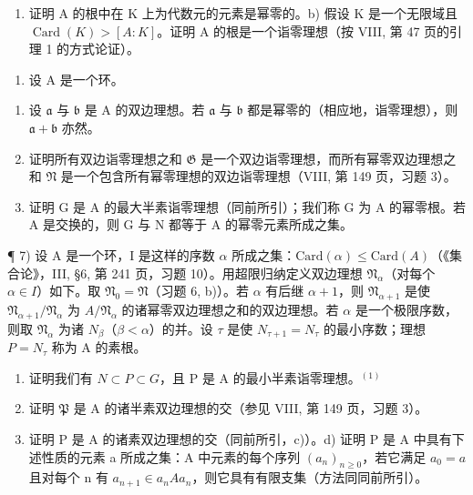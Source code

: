 \begin{enumerate}
\def\labelenumi{\alph{enumi})}
\tightlist
\item
  证明 A 的根中在 K 上为代数元的元素是幂零的。b) 假设 K 是一个无限域且 \(\operatorname{Card}(K) > [A : K]\)。证明 A 的根是一个诣零理想（按 VIII, 第 47 页的引理 1 的方式论证）。
\end{enumerate}

\begin{enumerate}
\def\labelenumi{\arabic{enumi})}
\setcounter{enumi}{5}
\tightlist
\item
  设 \(\mathrm{A}\) 是一个环。
\end{enumerate}

\begin{enumerate}
\def\labelenumi{\alph{enumi})}
\item
  设 \(\mathfrak{a}\) 与 \(\mathfrak{b}\) 是 A 的双边理想。若 \(\mathfrak{a}\) 与 \(\mathfrak{b}\) 都是幂零的（相应地，诣零理想），则 \(\mathfrak{a} + \mathfrak{b}\) 亦然。
\item
  证明所有双边诣零理想之和 \(\mathfrak{G}\) 是一个双边诣零理想，而所有幂零双边理想之和 \(\mathfrak{N}\) 是一个包含所有幂零理想的双边诣零理想（VIII, 第 149 页，习题 3）。
\item
  证明 G 是 A 的最大半素诣零理想（同前所引）；我们称 G 为 A 的幂零根。若 A 是交换的，则 G 与 N 都等于 A 的幂零元素所成之集。
\end{enumerate}

¶ 7) 设 A 是一个环，I 是这样的序数 \(\alpha\) 所成之集：\(\text{Card}(\alpha) \leqslant \text{Card}(A)\)（《集合论》，III, §6, 第 241 页，习题 10）。用超限归纳定义双边理想 \(\mathfrak{N}_{\alpha}\)（对每个 \(\alpha \in I\)）如下。取 \(\mathfrak{N}_0 = \mathfrak{N}\)（习题 6, b)）。若 \(\alpha\) 有后继 \(\alpha + 1\)，则 \(\mathfrak{N}_{\alpha+1}\) 是使 \(\mathfrak{N}_{\alpha+1}/\mathfrak{N}_{\alpha}\) 为 \(A/\mathfrak{N}_{\alpha}\) 的诸幂零双边理想之和的双边理想。若 \(\alpha\) 是一个极限序数，则取 \(\mathfrak{N}_{\alpha}\) 为诸 \(N_{\beta}\)（\(\beta < \alpha\)）的并。设 \(\tau\) 是使 \(N_{\tau+1} = N_{\tau}\) 的最小序数；理想 \(P = N_{\tau}\) 称为 A 的素根。

\begin{enumerate}
\def\labelenumi{\alph{enumi})}
\item
  证明我们有 \(N \subset P \subset G\)，且 P 是 A 的最小半素诣零理想。\(^{(1)}\)
\item
  证明 \(\mathfrak{P}\) 是 A 的诸半素双边理想的交（参见 VIII, 第 149 页，习题 3）。
\item
  证明 P 是 A 的诸素双边理想的交（同前所引，c)）。d) 证明 P 是 A 中具有下述性质的元素 a 所成之集：A 中元素的每个序列 \((a_{n})_{n\geqslant0}\)，若它满足 \(a_{0}=a\) 且对每个 n 有 \(a_{n+1}\in a_{n}Aa_{n}\)，则它具有有限支集（方法同同前所引）。
\end{enumerate}

